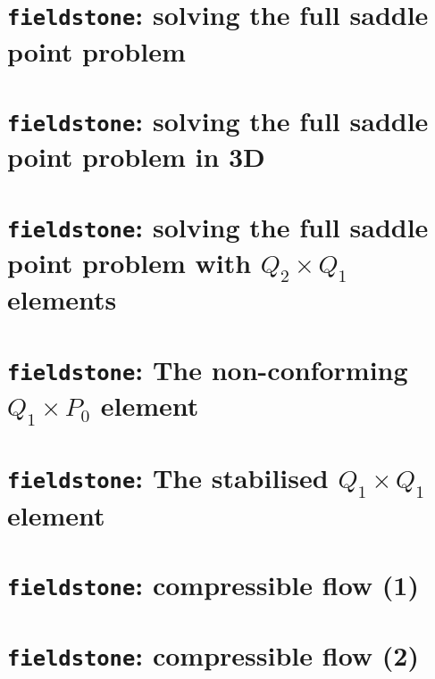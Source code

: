 \documentclass[a4paper]{article}
\begin{document}
\newpage
\section{{\tt fieldstone}: solving the full saddle point problem}


\newpage
\section{{\tt fieldstone}: solving the full saddle point problem in 3D}


\newpage
\section{{\tt fieldstone}: solving the full saddle point problem with $Q_2\times Q_1$ elements}



\newpage
\section{{\tt fieldstone}: The non-conforming $Q_1 \times P_0$ element} 


\newpage
\section{{\tt fieldstone}: The stabilised $Q_1 \times Q_1$ element} 


\newpage
\section{{\tt fieldstone}: compressible flow (1)}


\newpage
\section{{\tt fieldstone}: compressible flow (2)}

\end{document}
